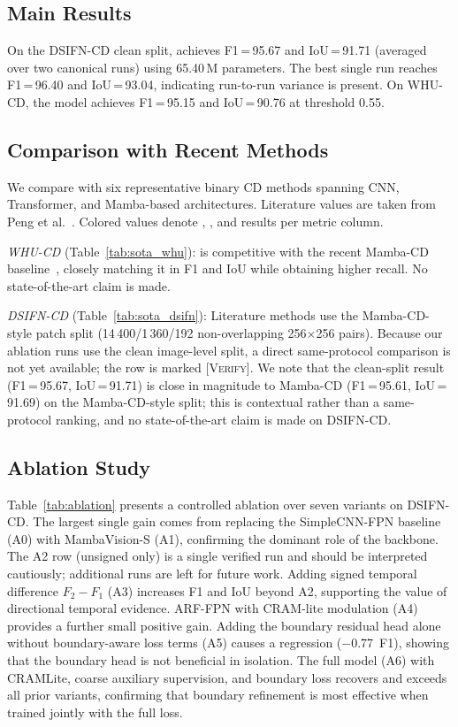 \subsection{Main Results}
\label{sec:main_results}
On the DSIFN-CD clean split, \ours{} achieves F1\,=\,95.67 and IoU\,=\,91.71 (averaged over two canonical runs) using 65.40\,M parameters. The best single run reaches F1\,=\,96.40 and IoU\,=\,93.04, indicating run-to-run variance is present. On WHU-CD, the model achieves F1\,=\,95.15 and IoU\,=\,90.76 at threshold 0.55.

\subsection{Comparison with Recent Methods}
\label{sec:sota_comparison}
We compare \ours{} with six representative binary CD methods spanning CNN, Transformer, and Mamba-based architectures. Literature values are taken from Peng et al.~\cite{peng2026mambacd}. Colored values denote , , and  results per metric column.

\emph{WHU-CD} (Table~\ref{tab:sota_whu}): \ours{} is competitive with the recent Mamba-CD baseline~\cite{peng2026mambacd}, closely matching it in F1 and IoU while obtaining higher recall. No state-of-the-art claim is made.

\emph{DSIFN-CD} (Table~\ref{tab:sota_dsifn}): Literature methods use the Mamba-CD-style patch split (14\,400/1\,360/192 non-overlapping 256$\times$256 pairs). Because our ablation runs use the clean image-level split, a direct same-protocol comparison is not yet available; the \ours{} row is marked \textsc{[Verify]}. We note that the clean-split result (F1\,=\,95.67, IoU\,=\,91.71) is close in magnitude to Mamba-CD (F1\,=\,95.61, IoU\,=\,91.69) on the Mamba-CD-style split; this is contextual rather than a same-protocol ranking, and no state-of-the-art claim is made on DSIFN-CD.




\subsection{Ablation Study}
\label{sec:ablation}
Table~\ref{tab:ablation} presents a controlled ablation over seven variants on DSIFN-CD. The largest single gain comes from replacing the SimpleCNN-FPN baseline (A0) with MambaVision-S (A1), confirming the dominant role of the backbone. The A2 row (unsigned \drbi{} only) is a single verified run and should be interpreted cautiously; additional runs are left for future work. Adding signed temporal difference $F_2 - F_1$ (A3) increases F1 and IoU beyond A2, supporting the value of directional temporal evidence. ARF-FPN with CRAM-lite modulation (A4) provides a further small positive gain. Adding the boundary residual head alone without boundary-aware loss terms (A5) causes a regression ($-$0.77~F1), showing that the boundary head is not beneficial in isolation. The full model (A6) with CRAMLite, coarse auxiliary supervision, and boundary loss recovers and exceeds all prior variants, confirming that boundary refinement is most effective when trained jointly with the full loss.

